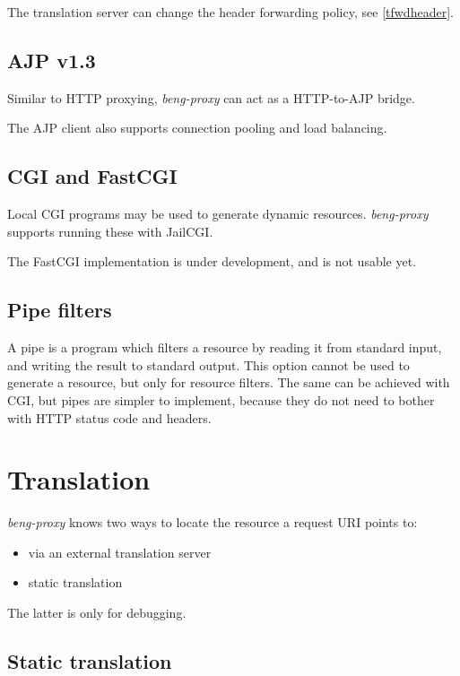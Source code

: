 \documentclass[a4paper,12pt]{article}
\begin{document}
The translation server can change the header forwarding policy, see
\ref{tfwdheader}.

\subsection{AJP v1.3}
\label{ajp}

Similar to HTTP proxying, \emph{beng-proxy} can act as a HTTP-to-AJP
bridge.

The AJP client also supports connection pooling and load balancing.

\subsection{CGI and FastCGI}
\label{cgi}

Local CGI programs may be used to generate dynamic resources.
\emph{beng-proxy} supports running these with JailCGI.

The FastCGI implementation is under development, and is not usable
yet.

\subsection{Pipe filters}
\label{pipe}

A pipe is a program which filters a resource by reading it from
standard input, and writing the result to standard output.  This
option cannot be used to generate a resource, but only for resource
filters.  The same can be achieved with CGI, but pipes are simpler to
implement, because they do not need to bother with HTTP status code
and headers.


\section{Translation}

\emph{beng-proxy} knows two ways to locate the resource a request URI
points to:

\begin{itemize}
\item via an external translation server
\item static translation
\end{itemize}

The latter is only for debugging.

\subsection{Static translation}
\end{document}
